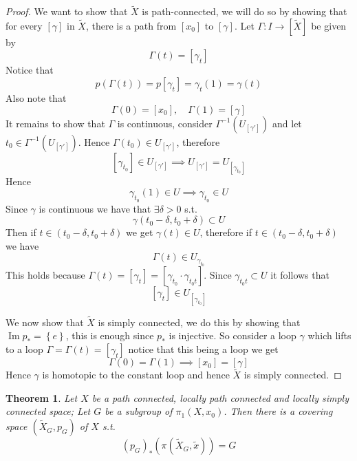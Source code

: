 \documentclass[11pt,a4paper]{article}
\theoremstyle{definition}
\theoremstyle{plain}
\newtheorem{theorem}[definition]{Theorem}
\theoremstyle{remark}
\renewcommand{\set}[1]{\left\{ #1 \right\}}
\newcommand{\1}{\mathbbm{1}}
\begin{document}
\begin{proof}
    We want to show that $\tilde{X}$ is path-connected, we will do so by showing that for every $[\gamma]$ in $\tilde{X}$, there
    is a path from $[x_0]$ to $[\gamma]$. Let $\Gamma \colon I \to [\tilde{X}]$ be given by 
    $$\Gamma (t) = [\gamma_t]$$
    Notice that 
    $$p(\Gamma(t)) = p [\gamma_t] = \gamma_t(1) = \gamma(t)$$
    Also note that 
    $$\Gamma(0) = [x_0], \quad \Gamma(1) = [\gamma]$$
    It remains to show that $\Gamma$ is continuous, consider $\Gamma^{-1}(U_{[\gamma']})$ and let $t_0 \in \Gamma^{-1}(U_{[\gamma']})$. 
    Hence $\Gamma(t_0) \in U_{[\gamma']}$, therefore 
    $$[\gamma_{t_0}] \in U_{[\gamma']} \implies U_{[\gamma']} = U_{[\gamma_{t_0}]}$$
    Hence 
    $$\gamma_{t_0} (1) \in U \implies \gamma_{t_0} \in U$$
    Since $\gamma$ is continuous we have that $\exists \delta > 0$ s.t. 
    $$\gamma(t_0 - \delta, t_0 + \delta) \subset U$$
    Then if $t \in (t_0 - \delta, t_0 + \delta)$ we get $\gamma(t) \in U$, therefore 
    if $t \in (t_0 - \delta, t_0 + \delta)$ we have 
    $$\Gamma(t) \in U_{\gamma_{t_0}}$$
    This holds because $\Gamma(t) = [\gamma_t] = [\gamma_{t_0} \cdot \gamma_{t_0t}]$. 
    Since $\gamma_{t_0t} \subset U$ it follows that 
    $$[\gamma_t] \in U_{[\gamma_{t_0}]}$$

    We now show that $\tilde{X}$ is simply connected, we do this by showing that $\operatorname{Im} p_* = \set{e}$, 
    this is enough since $p_*$ is injective. So consider a loop $\gamma$ which lifts to a loop $\Gamma = \Gamma(t) = [\gamma_t]$
    notice that this being a loop we get 
    $$\Gamma(0) = \Gamma(1) \implies [x_0] = [\gamma]$$
    Hence $\gamma$ is homotopic to the constant loop and hence $\tilde{X}$ is simply connected.
\end{proof}

\begin{theorem}
    Let $X$ be a path connected, locally path connected and locally simply connected space; Let $G$ be a subgroup 
    of $\pi_1(X, x_0)$. Then there is a covering space $(\tilde{X}_G, p_G)$ of $X$ s.t. 
    $$(p_G)_* (\pi(\tilde{X}_G, \tilde{x})) = G$$
\end{theorem}
\end{document}
